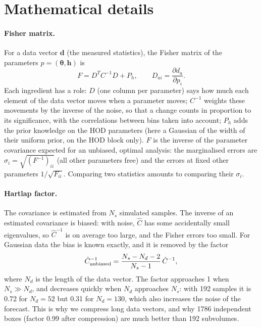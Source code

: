 \section{Mathematical details}
\label{app:maths}

\paragraph{Fisher matrix.} For a data vector $\boldsymbol d$ (the measured statistics), the Fisher matrix of the parameters $p=(\boldsymbol\theta,\boldsymbol h)$ is
\begin{equation}
F = D^T C^{-1} D + P_h, \qquad D_{ai} = \frac{\partial d_a}{\partial p_i}.
\end{equation}
Each ingredient has a role: $D$ (one column per parameter) says how much each element of the data vector moves when a parameter moves; $C^{-1}$ weights these movements by the inverse of the noise, so that a change counts in proportion to its significance, with the correlations between bins taken into account; $P_h$ adds the prior knowledge on the HOD parameters (here a Gaussian of the width of their uniform prior, on the HOD block only). $F$ is the inverse of the parameter covariance expected for an unbiased, optimal analysis: the marginalised errors are $\sigma_i=\sqrt{(F^{-1})_{ii}}$ (all other parameters free) and the errors at fixed other parameters $1/\sqrt{F_{ii}}$. Comparing two statistics amounts to comparing their $\sigma_i$.

\paragraph{Hartlap factor.} The covariance is estimated from $N_s$ simulated samples. The inverse of an estimated covariance is biased: with noise, $\hat C$ has some accidentally small eigenvalues, so $\hat C^{-1}$ is on average too large, and the Fisher errors too small. For Gaussian data the bias is known exactly, and it is removed by the factor \cite{Hartlap2007}
\begin{equation}
\hat C^{-1}_{\rm unbiased} = \frac{N_s-N_d-2}{N_s-1}\,\hat C^{-1},
\end{equation}
where $N_d$ is the length of the data vector. The factor approaches 1 when $N_s\gg N_d$, and decreases quickly when $N_d$ approaches $N_s$: with 192 samples it is 0.72 for $N_d=52$ but 0.31 for $N_d=130$, which also increases the noise of the forecast. This is why we compress long data vectors, and why 1786 independent boxes (factor 0.99 after compression) are much better than 192 subvolumes.

